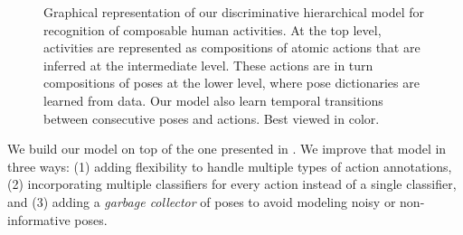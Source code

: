 \begin{figure}[tb]
\begin{center}
\fbox{\rule{0pt}{2in} \rule{0.9\linewidth}{0pt}}
\end{center}
   \caption{Graphical representation of our discriminative hierarchical model for recognition of composable human activities.
At the top level, activities are represented as compositions of atomic actions that are inferred at
the intermediate level. These actions are in turn compositions of poses at the
lower level, where pose dictionaries are learned from data. Our model also learn
temporal transitions between consecutive poses and actions. Best viewed in
color.}
\label{fig:overview}

\end{figure}

We build our model on top of the one presented in \cite{Lillo2014}. We improve that model in three ways: (1) adding flexibility to handle multiple types of action annotations, (2) incorporating multiple classifiers for every action instead of a single classifier, and (3) adding a \emph{garbage collector} of poses to avoid modeling noisy or non-informative poses. 








